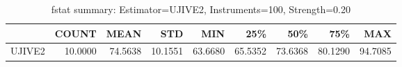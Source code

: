 \begin{table}[ht]
\centering
\caption{fstat summary: Estimator=UJIVE2, Instruments=100, Strength=0.20}
\begin{tabular}{lrrrrrrrr}
\toprule
 & COUNT & MEAN & STD & MIN & 25\% & 50\% & 75\% & MAX \\
\midrule
UJIVE2 & 10.0000 & 74.5638 & 10.1551 & 63.6680 & 65.5352 & 73.6368 & 80.1290 & 94.7085 \\
\bottomrule
\end{tabular}
\end{table}
